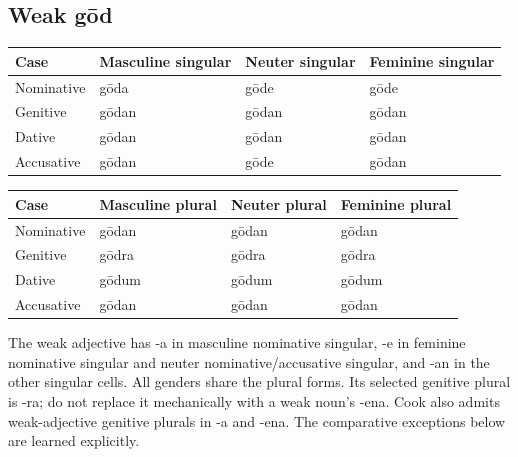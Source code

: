 \subsection*{Weak gōd}

\par\begingroup
\fontsize{10.5}{13.2}\selectfont
\setlength{\LTleft}{0pt}\setlength{\LTright}{\fill}
\noindent
\begin{tabular}{@{}>{\raggedright\arraybackslash}p{22.0mm}>{\raggedright\arraybackslash}p{31.188mm}>{\raggedright\arraybackslash}p{31.188mm}>{\raggedright\arraybackslash}p{31.188mm}@{}}
\toprule
\textbf{Case} & \textbf{Masculine singular} & \textbf{Neuter singular} & \textbf{Feminine singular} \\
\midrule
Nominative & gōda & gōde & gōde \\
Genitive & gōdan & gōdan & gōdan \\
Dative & gōdan & gōdan & gōdan \\
Accusative & gōdan & gōde & gōdan \\
\bottomrule
\end{tabular}
\par\endgroup
\par\addvspace{5pt}
\par\begingroup
\fontsize{10.5}{13.2}\selectfont
\setlength{\LTleft}{0pt}\setlength{\LTright}{\fill}
\noindent
\begin{tabular}{@{}>{\raggedright\arraybackslash}p{22.0mm}>{\raggedright\arraybackslash}p{31.188mm}>{\raggedright\arraybackslash}p{31.188mm}>{\raggedright\arraybackslash}p{31.188mm}@{}}
\toprule
\textbf{Case} & \textbf{Masculine plural} & \textbf{Neuter plural} & \textbf{Feminine plural} \\
\midrule
Nominative & gōdan & gōdan & gōdan \\
Genitive & gōdra & gōdra & gōdra \\
Dative & gōdum & gōdum & gōdum \\
Accusative & gōdan & gōdan & gōdan \\
\bottomrule
\end{tabular}
\par\endgroup
The weak adjective has -a in masculine nominative singular, -e in feminine nominative singular and neuter nominative/\allowbreak{}accusative singular, and -an in the other singular cells. All genders share the plural forms. Its selected genitive plural is -ra; do not replace it mechanically with a weak noun’s -ena. Cook also admits weak-adjective genitive plurals in -a and -ena. The comparative exceptions below are learned explicitly.


